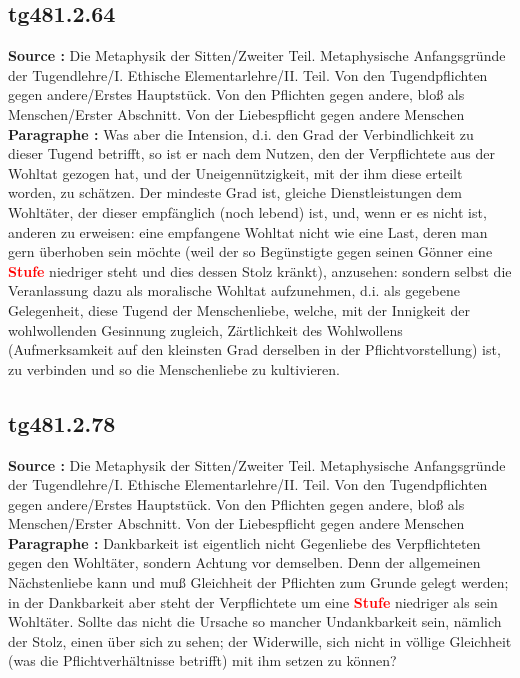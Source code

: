 \documentclass[a4paper,12pt,twoside]{book}
\newcommand{\match}[1]{\textcolor{red}{\textbf{#1}}}
\begin{document}
	\subsection*{tg481.2.64} 
	\textbf{Source : }Die Metaphysik der Sitten/Zweiter Teil. Metaphysische Anfangsgründe der Tugendlehre/I. Ethische Elementarlehre/II. Teil. Von den Tugendpflichten gegen andere/Erstes Hauptstück. Von den Pflichten gegen andere, bloß als Menschen/Erster Abschnitt. Von der Liebespflicht gegen andere Menschen\\  
	
	\textbf{Paragraphe : }Was aber die Intension, d.i. den Grad der Verbindlichkeit zu dieser Tugend betrifft, so ist er nach dem Nutzen, den der Verpflichtete aus der Wohltat gezogen hat, und der Uneigennützigkeit, mit der ihm diese erteilt worden, zu schätzen. Der mindeste Grad ist, gleiche Dienstleistungen dem Wohltäter, der dieser empfänglich (noch lebend) ist, und, wenn er es nicht ist, anderen zu erweisen: eine empfangene Wohltat nicht wie eine Last, deren man gern überhoben sein möchte (weil der so Begünstigte gegen seinen Gönner eine \match{Stufe} niedriger steht und dies dessen Stolz kränkt), anzusehen: sondern selbst die Veranlassung dazu als moralische Wohltat aufzunehmen, d.i. als gegebene Gelegenheit, diese Tugend der Menschenliebe, welche, mit der Innigkeit der wohlwollenden Gesinnung zugleich, Zärtlichkeit des Wohlwollens (Aufmerksamkeit auf den kleinsten Grad derselben in der Pflichtvorstellung) ist, zu verbinden und so die Menschenliebe zu kultivieren. 
	
	\subsection*{tg481.2.78} 
	\textbf{Source : }Die Metaphysik der Sitten/Zweiter Teil. Metaphysische Anfangsgründe der Tugendlehre/I. Ethische Elementarlehre/II. Teil. Von den Tugendpflichten gegen andere/Erstes Hauptstück. Von den Pflichten gegen andere, bloß als Menschen/Erster Abschnitt. Von der Liebespflicht gegen andere Menschen\\  
	
	\textbf{Paragraphe : }Dankbarkeit ist eigentlich nicht Gegenliebe des Verpflichteten gegen den Wohltäter, sondern Achtung vor demselben. Denn der allgemeinen Nächstenliebe kann und muß Gleichheit der Pflichten zum Grunde gelegt werden; in der Dankbarkeit aber steht der Verpflichtete um eine \match{Stufe} niedriger als sein Wohltäter. Sollte das nicht die Ursache so mancher Undankbarkeit sein, nämlich der Stolz,  einen über sich zu sehen; der Widerwille, sich nicht in völlige Gleichheit (was die Pflichtverhältnisse betrifft) mit ihm setzen zu können? 
	
\end{document}
